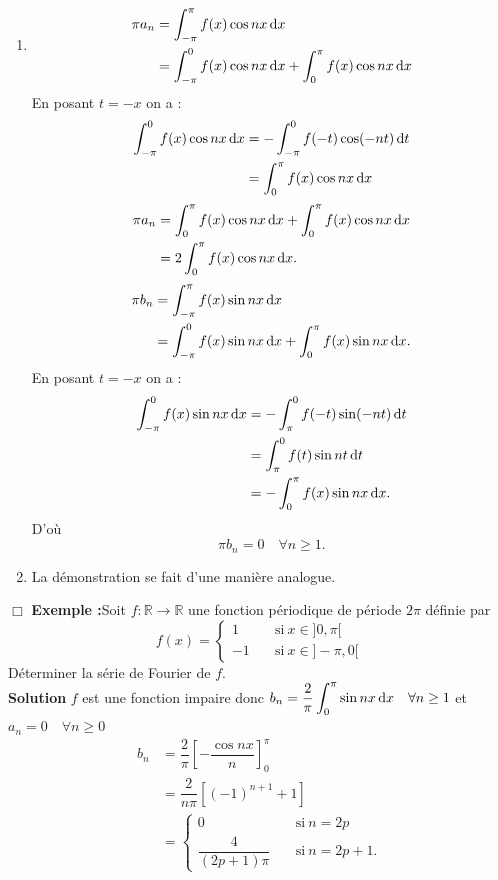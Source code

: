 \documentclass[11pt, a4paper]{book}
\newenvironment{pr}{\noindent {\bf Preuve} \noindent} {\hfill $\Box$\vskip 5mm}
\begin{document}
\begin{pr}\quad
\begin{enumerate}
\item 
\begin{align*}
\pi a_n&=\int_{-\pi}^\pi f(x)\cos nx\,\mathrm{d} x\\&=\int_{-\pi}^0f(x)\cos nx\,\mathrm{d} x+\int_0^\pi f(x)\cos nx\,\mathrm{d} x
\end{align*}
En posant $t=-x$ on a : 
\begin{align*}
\int_{-\pi}^0 f(x)\cos nx\,\mathrm{d} x&=-\int_{-\pi}^0 f(-t)\cos (-nt)\,\mathrm{d} t\\&=\int_0^\pi f(x)\cos nx\,\mathrm{d} x
\end{align*}
\begin{align*}
\pi a_n&=\int_0^\pi f(x)\cos nx\,\mathrm{d} x+\int_0^\pi f(x)\cos nx\,\mathrm{d} x\\ &=2\int_0^\pi f(x)\cos nx\,\mathrm{d} x.
\end{align*}
\begin{align*}
\pi b_n&=\int_{-\pi}^\pi f(x)\sin nx\,\mathrm{d} x\\&=\int_{-\pi}^0 f(x)\sin nx\,\mathrm{d} x+\int_0^\pi f(x)\sin nx\,\mathrm{d} x.
\end{align*}
En posant $t=-x$ on a : \begin{align*}
\int_{-\pi}^0 f(x)\sin nx\,\mathrm{d} x&=-\int_{\pi}^0 f(-t)\sin (-nt)\,\mathrm{d} t\\&=\int_\pi^0 f(t)\sin nt \,\mathrm{d} t\\&=-\int_0^\pi f(x)\sin nx\,\mathrm{d} x.
\end{align*} D'o\`u $$\pi b_n=0\quad \forall n\geq 1.$$ 
\item La d\'emonstration se fait d'une mani\`ere analogue.
\end{enumerate}
\end{pr}
\textbf{Exemple :}\quad Soit $f:\mathbb{R}\rightarrow\mathbb{R}$ une fonction p\'eriodique de p\'eriode $2\pi$ d\'efinie par $$f(x)=\begin{cases}  1&\quad\text{si}~x\in ]0,\pi[\\ -1&\quad\text{si}~x\in ]-\pi,0[ \end{cases}$$ 
D\'eterminer la s\'erie de Fourier de $f$.\\
\textbf{Solution}  $f$ est une fonction impaire donc ${\displaystyle b_n=\dfrac{2}{\pi}\int_0^\pi \sin nx\,\mathrm{d} x\quad\forall n\geq 1}$ et $a_n=0\quad\forall n\geq 0$ 
\begin{align*} b_n&=\dfrac{2}{\pi}\left[-\dfrac{\cos nx}{n}\right]_0^\pi\\&=\dfrac{2}{n\pi}\left[(-1)^{n+1}+1\right]\\&= \begin{cases} 0 &\quad \text{si}~n=2p\\ \dfrac{4}{(2p+1)\pi}&\quad \text{si}~n=2p+1.\end{cases}
\end{align*}
\end{document}
